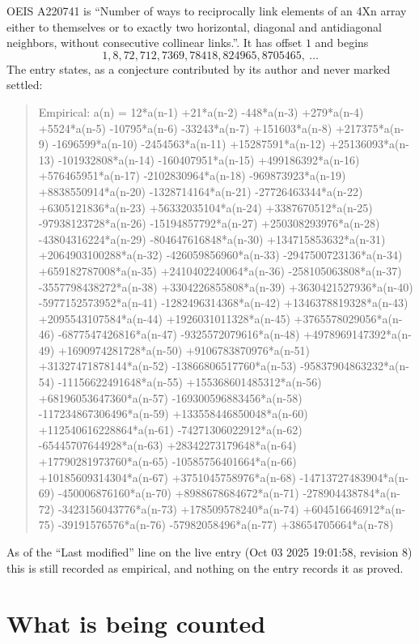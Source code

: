 \documentclass[11pt,a4paper]{article}
\theoremstyle{plain}
\theoremstyle{definition}
\begin{document}
OEIS A220741 is ``Number of ways to reciprocally link elements of an 4Xn array either to themselves or to exactly two horizontal, diagonal and antidiagonal neighbors, without consecutive collinear links.''. It has offset $1$ and begins
\[
1, 8, 72, 712, 7369, 78418, 824965, 8705465,\ \dots
\]
The entry states, as a conjecture contributed by its author and never marked settled:
\begin{quote}
Empirical: a(n) = 12*a(n-1) +21*a(n-2) -448*a(n-3) +279*a(n-4) +5524*a(n-5) -10795*a(n-6) -33243*a(n-7) +151603*a(n-8) +217375*a(n-9) -1696599*a(n-10) -2454563*a(n-11) +15287591*a(n-12) +25136093*a(n-13) -101932808*a(n-14) -160407951*a(n-15) +499186392*a(n-16) +576465951*a(n-17) -2102830964*a(n-18) -969873923*a(n-19) +8838550914*a(n-20) -1328714164*a(n-21) -27726463344*a(n-22) +6305121836*a(n-23) +56332035104*a(n-24) +3387670512*a(n-25) -97938123728*a(n-26) -15194857792*a(n-27) +250308293976*a(n-28) -43804316224*a(n-29) -804647616848*a(n-30) +134715853632*a(n-31) +2064903100288*a(n-32) -426059856960*a(n-33) -2947500723136*a(n-34) +659182787008*a(n-35) +2410402240064*a(n-36) -258105063808*a(n-37) -3557798438272*a(n-38) +3304226855808*a(n-39) +3630421527936*a(n-40) -5977152573952*a(n-41) -1282496314368*a(n-42) +1346378819328*a(n-43) +2095543107584*a(n-44) +1926031011328*a(n-45) +3765578029056*a(n-46) -6877547426816*a(n-47) -9325572079616*a(n-48) +4978969147392*a(n-49) +1690974281728*a(n-50) +9106783870976*a(n-51) +31327471878144*a(n-52) -13866806517760*a(n-53) -95837904863232*a(n-54) -11156622491648*a(n-55) +155368601485312*a(n-56) +68196053647360*a(n-57) -169300596883456*a(n-58) -117234867306496*a(n-59) +133558446850048*a(n-60) +112540616228864*a(n-61) -74271306022912*a(n-62) -65445707644928*a(n-63) +28342273179648*a(n-64) +17790281973760*a(n-65) -10585756401664*a(n-66) +10185609314304*a(n-67) +3751045758976*a(n-68) -14713727483904*a(n-69) -450006876160*a(n-70) +8988678684672*a(n-71) -278904438784*a(n-72) -3423156043776*a(n-73) +178509578240*a(n-74) +604516646912*a(n-75) -39191576576*a(n-76) -57982058496*a(n-77) +38654705664*a(n-78)
\end{quote}
As of the ``Last modified'' line on the live entry (Oct 03 2025 19:01:58, revision 8) this is still
recorded as empirical, and nothing on the entry records it as proved.

\section{What is being counted}
\end{document}
